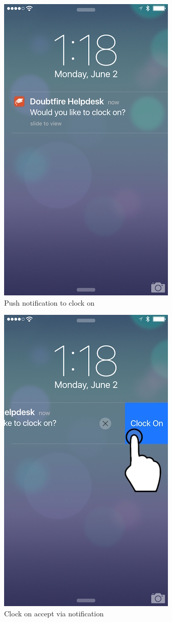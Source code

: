 \documentclass[12pt,a4paper,]{article}
\begin{document}
\begin{figure}[p]
  \centering
  \includegraphics[]{4a9727edb2.jpg}
  \caption{Push notification to clock on}
  \label{pushnotif}
\end{figure}

\begin{figure}[p]
\centering
\includegraphics[]{cb0c91061e.jpg}
\caption{Clock on accept via notification}
\label{clockonnotif}
\end{figure}
\end{document}
